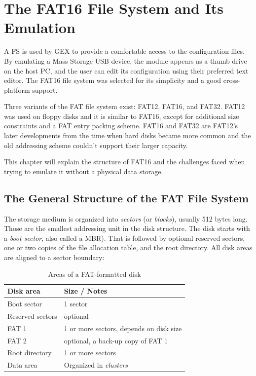 \chapter{The FAT16 File System and Its Emulation} \label{sec:fat16}

A \gls{FS} is used by GEX to provide a comfortable access to the configuration files. By emulating a Mass Storage \gls{USB} device, the module appears as a thumb drive on the host \gls{PC}, and the user can edit its configuration using their preferred text editor. The FAT16 file system was selected for its simplicity and a good cross-platform support.

Three variants of the \gls{FAT} file system exist: FAT12, FAT16, and FAT32. FAT12 was used on floppy disks and it is similar to FAT16, except for additional size constraints and a \gls{FAT} entry packing scheme. FAT16 and FAT32 are FAT12's later developments from the time when hard disks became more common and the old addressing scheme couldn't support their larger capacity.

This chapter will explain the structure of FAT16 and the challenges faced when trying to emulate it without a physical data storage.

\section{The General Structure of the FAT File System}

The storage medium is organized into \textit{sectors} (or \textit{blocks}), usually 512 bytes long. Those are the smallest addressing unit in the disk structure. The disk starts with a \textit{boot sector}, also called a \gls{MBR}). That is followed by optional reserved sectors, one or two copies of the file allocation table, and the root directory. All disk areas are aligned to a sector boundary:

\begin{table}[h]
	\centering
	\begin{tabular}{ll}
		\toprule
		\textbf{Disk area} & \textbf{Size / Notes} \\
		\midrule
		Boot sector & 1 sector \\
		Reserved sectors & optional \\
		FAT 1 & 1 or more sectors, depends on disk size \\
		FAT 2 & optional, a back-up copy of FAT 1 \\
		Root directory & 1 or more sectors \\
		Data area & Organized in \textit{clusters} \\
		\bottomrule
	\end{tabular}
	\caption{\label{tab:fat16-disk-areas}Areas of a FAT-formatted disk}
\end{table}

